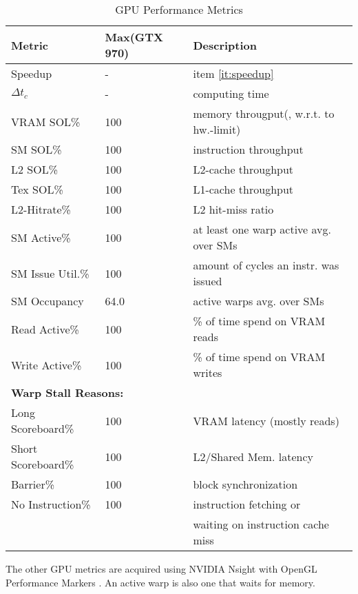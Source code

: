 \documentclass[m,times]{cgMA}
\begin{document}
\begin{table}
  \begin{tabular}{ | l | l | l |}    \hline
    \textbf{Metric}   & \textbf{Max}(GTX 970) & \textbf{Description} \\ \hline
    Speedup           & -                     & item \ref{it:speedup}\\\hline
    $\Delta t_c$      & -                     & computing time\\\hline
    VRAM SOL\%        & 100                   & memory througput(, w.r.t. to hw.-limit)\\\hline
    SM SOL\%          & 100                   & instruction throughput\\\hline
    L2 SOL\%          & 100                   & L2-cache throughput\\\hline
    Tex SOL\%         & 100                   & L1-cache throughput\\\hline
    L2-Hitrate\%      & 100                   & L2 hit-miss ratio\\\hline
    SM Active\%       & 100                   & at least one warp active avg. over SMs\\\hline
    SM Issue Util.\%  & 100                   & amount of cycles an instr. was issued\\\hline
    SM Occupancy      & 64.0                  & active warps avg. over SMs\\\hline
    Read Active\%     & 100                   & \% of time spend on VRAM reads\\\hline
    Write Active\%    & 100                   & \% of time spend on VRAM writes\\\hline
    \multicolumn{3}{|l|}{\textbf{Warp Stall Reasons:}}\\\hline
    Long Scoreboard\% & 100                   & VRAM latency (mostly reads)\\\hline
    Short Scoreboard\%& 100                   & L2/Shared Mem. latency\\\hline
    Barrier\%         & 100                   & block synchronization \\\hline
    No Instruction\%  & 100                   & instruction fetching or\\
		      &                       & waiting on instruction cache miss\\\hline
  \end{tabular}
\caption{GPU Performance Metrics}\label{table:metric}
\end{table}
The other GPU metrics are acquired using NVIDIA Nsight with OpenGL Performance Markers \cite{NVIDIA:METRICS}. An active warp is also one that waits for memory.
\end{document}
